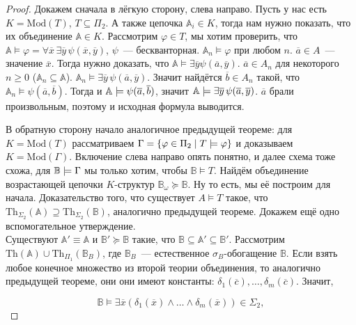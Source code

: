 \begin{proof}
    Докажем сначала в лёгкую сторону, слева направо. Пусть у нас есть $K = \text{Mod}(T)$, $T \subseteq \Pi_2$. А также цепочка $\mathbb{A}_i \in K$, тогда нам нужно показать, что их объединение $\mathbb{A} \in K$. Рассмотрим $\varphi \in T$, мы хотим проверить, что $\mathbb{A} \models \varphi =  \forall \overline{x}\, \exists \overline{y}\, \psi (\overline{x}, \overline{y})$, $\psi$~— бескванторная. $\mathbb{A}_n \models \varphi$ при любом $n$. $\overline{a} \in A$~— значение $\overline{x}$. Тогда нужно доказать, что $\mathbb{A} \models \exists \overline{y} \psi(\overline{a}, \overline{y})$. $\overline{a} \in A_n$ для некоторого $n \geq 0$ ($\mathbb{A}_n \subseteq \mathbb{A}$). $\mathbb{A}_n \models \exists \overline{y}\, \psi (\overline{a}, \overline{y})$. Значит найдётся $\overline{b} \in A_n$ такой, что  $\mathbb{A}_n \models \psi(\overline{a}, \overline{b})$. Тогда и $\ba\models\psi(\overline{a},\overline{b})$, значит $\ba\models\exists\overline{y}\,\psi(\overline{a}, \overline{y})$. $\overline{a}$ брали произвольным, поэтому и исходная формула выводится.

    В обратную сторону начало аналогичное предыдущей теореме: для $K = \text{Mod}(T)$ рассматриваем $\Gamma = \set*{\vfi\in\Pi_2 \mid T\models \vfi}$ и доказываем $K=\text{Mod}(\Gamma)$.  Включение слева направо опять понятно, и далее схема тоже схожа, для $\bb\models \Gamma$ мы только хотим, чтобы $\mathbb{B} \models T$. Найдём объединение возрастающей цепочки $K$-структур $\mathbb{B}_\omega \succeq \mathbb{B}$. Ну то есть, мы её построим для начала. Доказательство того, что существует $A \models T$ такое, что $\text{Th}_{\Sigma_2}(\mathbb{A}) \supseteq \text{Th}_{\Sigma_2}(\mathbb{B})$, аналогично предыдущей теореме. Докажем ещё одно вспомогательное утверждение. \\

    Существуют $\mathbb{A}' \equiv \mathbb{A}$ и $\mathbb{B}' \succeq \mathbb{B}$ такие, что $\mathbb{B} \subseteq \mathbb{A}' \subseteq \mathbb{B}'$. Рассмотрим $\text{Th}(\mathbb{A}) \cup \text{Th}_{\Pi_1}(\mathbb{B}_B)$, где $\mathbb{B}_B$~— естественное $\sigma_B$-обогащение $\mathbb{B}$. Если взять любое конечное множество из второй теории объединения, то аналогично предыдущей теореме, они они имеют константы: $\delta_1(\overline{c}), \ldots, \delta_m(\overline{c})$. Значит, 

    \[ 
        \mathbb{B} \models \exists \overline{x} (\delta_1(\overline{x}) \wedge \ldots \wedge \delta_m(\overline{x})) \in \Sigma_2,
    \]


\end{proof}
